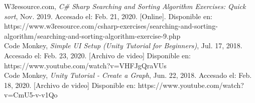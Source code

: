 \documentclass[conference]{IEEEtran}
\begin{document}
\begin{thebibliography}{00}
 W3resource.com, \textit{C\# Sharp Searching and Sorting Algorithm Exercises: Quick sort}, Nov. 2019. Accesado el: Feb. 21, 2020. [Online]. Disponible en: https://www.w3resource.com/csharp-exercises/searching-and-sorting-algorithm/searching-and-sorting-algorithm-exercise-9.php\\
 Code Monkey, \textit{Simple UI Setup (Unity Tutorial for Beginners)}, Jul. 17, 2018. Accesado el: Feb. 23, 2020. [Archivo de video] Disponible en: https://www.youtube.com/watch?v=VHFJgQraVUs\\
 Code Monkey, \textit{Unity Tutorial - Create a Graph}, Jun. 22, 2018. Accesado el: Feb. 18, 2020. [Archivo de video] Disponible en: https://www.youtube.com/watch?v=CmU5-v-v1Qo
\end{thebibliography}
\end{document}
